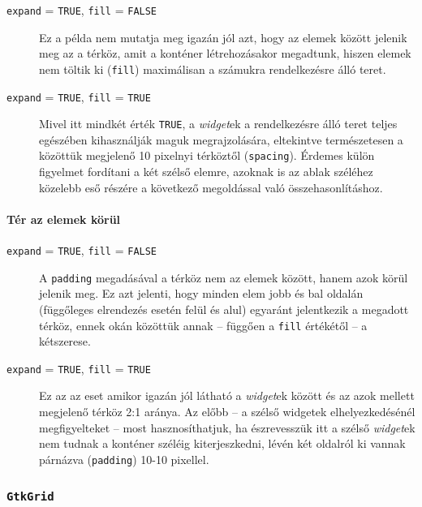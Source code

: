 \begin{description}
 \item[\texttt{expand} = \texttt{TRUE}, \texttt{fill} = \texttt{FALSE}] Ez a példa nem mutatja meg igazán jól azt, hogy az elemek között jelenik meg az a térköz, amit a konténer létrehozásakor megadtunk, hiszen elemek nem töltik ki (\texttt{fill}) maximálisan a számukra rendelkezésre álló teret.
 \item[\texttt{expand} = \texttt{TRUE}, \texttt{fill} = \texttt{TRUE}] Mivel itt mindkét érték \texttt{TRUE}, a \textit{widget}ek a rendelkezésre álló teret teljes egészében kihasználják maguk megrajzolására, eltekintve természetesen a közöttük megjelenő 10 pixelnyi térköztől (\texttt{spacing}). Érdemes külön figyelmet fordítani a két szélső elemre, azoknak is az ablak széléhez közelebb eső részére a következő megoldással való összehasonlításhoz.
\end{description}

\paragraph{Tér az elemek körül}

\begin{description}
 \item[\texttt{expand} = \texttt{TRUE}, \texttt{fill} = \texttt{FALSE}] A \texttt{padding} megadásával a térköz nem az elemek között, hanem azok körül jelenik meg. Ez azt jelenti, hogy minden elem jobb és bal oldalán (függőleges elrendezés esetén felül és alul) egyaránt jelentkezik a megadott térköz, ennek okán közöttük annak -- függően a \texttt{fill} értékétől -- a kétszerese.

 \item[\texttt{expand} = \texttt{TRUE}, \texttt{fill} = \texttt{TRUE}] Ez az az eset amikor igazán jól látható a \textit{widget}ek között és az azok mellett megjelenő térköz 2:1 aránya. Az előbb -- a szélső widgetek elhelyezkedésénél megfigyelteket -- most hasznosíthatjuk, ha észrevesszük itt a szélső \textit{widget}ek nem tudnak a konténer széléig kiterjeszkedni, lévén két oldalról ki vannak párnázva (\texttt{padding}) 10-10 pixellel.
\end{description}

\subsubsection{\texttt{GtkGrid}}

